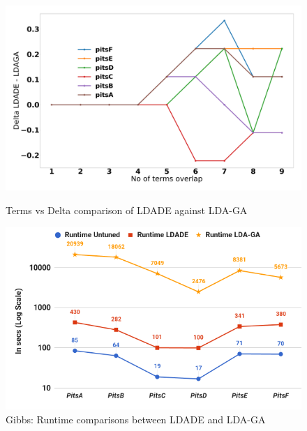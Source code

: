 \documentclass[twocolumn,5p,sort&compress]{elsarticle}
\theoremstyle{break}
\begin{document}
\begin{figure}[!t]
    \centering
  \begin{minipage}{.49\textwidth}
        \captionsetup{labelsep=space,justification=centering}
       \includegraphics[width=\linewidth]{./fig/ldaga.png}
  \caption{Terms vs Delta comparison of LDADE against LDA-GA}
  \label{fig:ldaga}
  \end{minipage}
  \begin{minipage}{.49\textwidth}
        \captionsetup{justification=centering}
        \includegraphics[width=\linewidth]{./fig/runtime_ga.png}
  \caption{Gibbs: Runtime comparisons between LDADE and LDA-GA}
  \label{fig:run_ldaga}
    \end{minipage}%
\end{figure}
\end{document}
